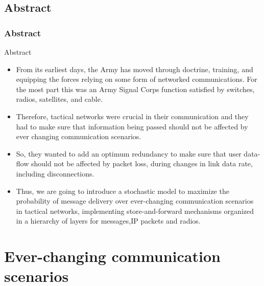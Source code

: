 \documentclass{beamer}
\begin{document}
\subsection*{Abstract}
\begin{frame}[fragile]
\frametitle{Abstract}
\begin{block}{Abstract}
\begin{itemize}
    \item From its earliest days, the Army has moved through doctrine, training, and equipping the forces relying on some form of networked communications. For the most part this was an Army Signal Corps function satisfied by switches, radios, satellites, and cable. 
    \item Therefore, tactical networks were crucial in their communication and they had to make sure that information being passed should not be affected by ever changing communication scenarios.
   \item So, they wanted to add an optimum redundancy to make sure that user data-flow should not be affected by packet loss, during changes in link data rate, including disconnections.
   \item Thus, we are going to introduce a stochastic model to maximize the probability of message delivery over ever-changing communication scenarios in tactical networks, implementing store-and-forward mechanisms organized in a hierarchy of layers for messages,IP packets and radios.
\end{itemize}
\end{block}
\end{frame}
\section{\textbf{Ever-changing communication scenarios}}
\end{document}
